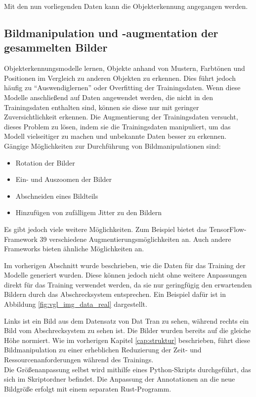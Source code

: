 Mit den nun vorliegenden Daten kann die Objekterkennung angegangen werden.


\subsection{Bildmanipulation und -augmentation der gesammelten Bilder} \label{cap:augment}

Objekterkennungsmodelle lernen, Objekte anhand von Mustern, Farbtönen und Positionen im Vergleich zu anderen Objekten zu erkennen. Dies führt jedoch häufig zu \enquote{Auswendiglernen} oder Overfitting der Trainingsdaten. Wenn diese Modelle anschließend auf Daten angewendet werden, die nicht in den Trainingsdaten enthalten sind, können sie diese nur mit geringer Zuversichtlichkeit erkennen. Die Augmentierung der Trainingsdaten versucht, dieses Problem zu lösen, indem sie die Trainingsdaten manipuliert, um das Modell vielseitiger zu machen und unbekannte Daten besser zu erkennen.
\\
Gängige Möglichkeiten zur Durchführung von Bildmanipulationen sind:
\begin{itemize}
    \item Rotation der Bilder
    \item Ein- und Auszoomen der Bilder
    \item Abschneiden eines Bildteils
    \item Hinzufügen von zufälligem Jitter zu den Bildern
\end{itemize}
Es gibt jedoch viele weitere Möglichkeiten. Zum Beispiel bietet das TensorFlow-Framework 39 verschiedene Augmentierungsmöglichkeiten an. Auch andere Frameworks bieten ähnliche Möglichkeiten an. \cite{cv_Szeliski,tens_zoo}

Im vorherigen Abschnitt wurde beschrieben, wie die Daten für das Training der Modelle generiert wurden. Diese können jedoch nicht ohne weitere Anpassungen direkt für das Training verwendet werden, da sie nur geringfügig den erwartenden Bildern durch das Abschrecksystem entsprechen. Ein Beispiel dafür ist in Abbildung \ref{fig:vgl_img_data_real} dargestellt.

Links ist ein Bild aus dem Datensatz von Dat Tran zu sehen, während rechts ein Bild vom Abschrecksystem zu sehen ist. Die Bilder wurden bereits auf die gleiche Höhe normiert. Wie im vorherigen Kapitel \ref{cap:struktur} beschrieben, führt diese Bildmanipulation zu einer erheblichen Reduzierung der Zeit- und Ressourcenanforderungen während des Trainings.
\\
Die Größenanpassung selbst wird mithilfe eines Python-Skripts durchgeführt, das sich im Skriptordner befindet. Die Anpassung der Annotationen an die neue Bildgröße erfolgt mit einem separaten Rust-Programm.

